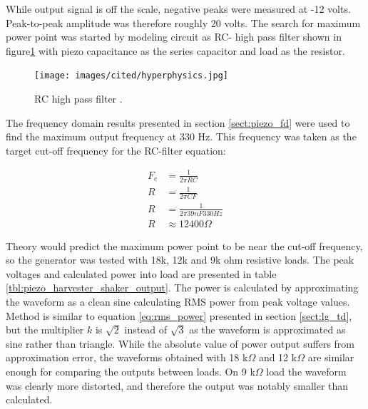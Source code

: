 While output signal is off the scale, negative peaks were measured at -12 volts. Peak-to-peak amplitude was therefore roughly 20 volts. The search for maximum power point was started by modeling circuit as RC- high pass filter shown in figure\ref{fig:rc_highpass} with piezo capacitance as the series capacitor and load as the resistor. 

\begin{figure}[htb]
\begin{center}
\texttt{[image: images/cited/hyperphysics.jpg]}
\end{center}
\caption{\label{fig:rc_highpass} RC high pass filter \cite{hyperphysics}.}
\end{figure}

The frequency domain results presented in section \ref{sect:piezo_fd} were used to find the maximum output frequency at 330 Hz. This frequency was taken as the target cut-off frequency for the RC-filter equation:

\begin{equation}
\begin{split}
  F_c &= \frac{1}{2 \pi R C} \\
  R   &= \frac{1}{2 \pi C F} \\
  R   &= \frac{1}{2 \pi 39 nF 330 Hz} \\
  R   &\approx 12 400 \Omega 
\end{split}
\end{equation}

Theory would predict the maximum power point to be near the cut-off frequency, so the generator was tested with 18k, 12k and 9k ohm resistive loads. The peak voltages and calculated power into load are presented in table \ref{tbl:piezo_harvester_shaker_output}. The power is calculated by approximating the waveform as a clean sine calculating RMS power from peak voltage values. Method is similar to equation \eqref{eq:rms_power} presented in section \ref{sect:lg_td}, but the multiplier $k$ is $\sqrt{2}$ instead of $\sqrt{3}$ as the waveform is approximated as sine rather than triangle. While the absolute value of power output suffers from approximation error, the waveforms obtained with 18 k$\Omega$ and 12 k$\Omega$ are similar enough for comparing the outputs between loads. On 9 k$\Omega$ load the waveform was clearly more distorted, and therefore the output was notably smaller than calculated.

\begin{table}[htb]
\caption{\label{tbl:piezo_harvester_shaker_output} Output power of piezo harvester at 18 k$\Omega$, 12 k$\Omega$ and 9 k$\Omega$ loads.}
\begin{center}
\end{center}
\end{table}

